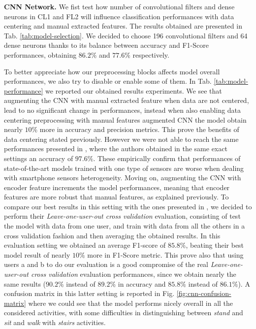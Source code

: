 \textbf{CNN Network.} We fist test how number of convolutional filters and dense neurons in CL1 and FL2 will influence classification performances with data centering and manual extracted features. The results obtained are presented in Tab. \ref{tab:model-selection}. We decided to choose 196 convolutional filters and 64 dense neurons thanks to its balance between accuracy and F1-Score performances, obtaining $86.2\%$ and $77.6\%$ respectively. 

To better appreciate how our preprocessing blocks affects model overall performances, we also try to disable or enable some of them. In Tab. \ref{tab:model-performance} we reported our obtained results experiments. We see that augmenting the CNN with manual extracted feature when data are not centered, lead to no significant change in performances, instead when also enabling data centering preprocessing with manual features augmented CNN the model obtain nearly $10\%$ more in accuracy and precision metrics. This prove the benefits of data centering stated previously. However we were not able to reach the same performances presented in \cite{ignatov2018real}, where the authors obtained in the same exact settings an accuracy of $97.6\%$. These empirically confirm that performances of state-of-the-art models trained with one type of sensors are worse when dealing with smartphone sensors heterogeneity. Moving on, augmenting the CNN with encoder feature increments the model performances, meaning that encoder features are more robust that manual features, as explained previously. To compare our best results in this setting with the ones presented in \cite{stisen2015smart}, we decided to perform their \textit{Leave-one-user-out cross validation} evaluation, consisting of test the model with data from one user, and train with data from all the others in a cross validation fashion and then averaging the obtained results. In this evaluation setting we obtained an average F1-score of $85.8\%$, beating their best model result of nearly $10\%$ more in F1-Score metric. This prove also that using users a and b to do our evaluation is a good compromise of the real \textit{Leave-one-user-out cross validation} evaluation performances, since we obtain nearly the same results ($90.2\%$ instead of $89.2\%$ in accuracy and $85.8\%$ instead of $86.1\%$). A confusion matrix in this latter setting is reported in Fig. \ref{fig:cnn-confusion-matrix} where we could see that the model performs nicely overall in all the considered activities, with some difficulties in distinguishing between \textit{stand} and \textit{sit} and \textit{walk} with \textit{stairs} activities.


